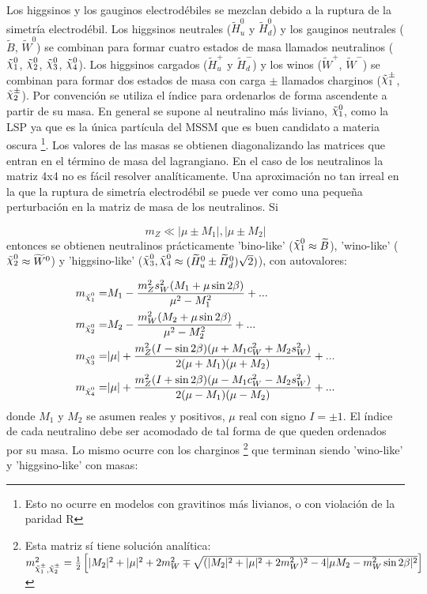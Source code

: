 Los higgsinos y los gauginos electrodébiles se mezclan debido a la ruptura de la simetría electrodébil. Los higgsinos neutrales ($\widetilde{H}_u^0$ y $\widetilde{H}_d^0$) y los gauginos neutrales ($\widetilde{B}$, $\widetilde{W}^0$) se combinan para formar cuatro estados de masa llamados neutralinos ($\ninoone$, $\ninotwo$, $\ninothree$, $\ninofour$). Los higgsinos cargados ($\widetilde{H}_u^+$ y $\widetilde{H}_d^-$) y los winos ($\widetilde{W}^+$, $\widetilde{W}^-$) se combinan para formar dos estados de masa con carga $\pm$ llamados charginos ($\chinoonepm$, $\chinotwopm$). Por convención se utiliza el índice para ordenarlos de forma ascendente a partir de su masa. En general se supone al neutralino más liviano, $\ninoone$, como la LSP ya que es la única partícula del MSSM que es buen candidato a materia oscura \footnote{Esto no ocurre en modelos con gravitinos más livianos, o con violación de la paridad R}. Los valores de las masas se obtienen diagonalizando las matrices que entran en el término de masa del lagrangiano. En el caso de los neutralinos la matriz 4x4 no es fácil resolver analíticamente. Una aproximación no tan irreal en la que la ruptura de simetría electrodébil se puede ver como una pequeña perturbación en la matriz de masa de los neutralinos. Si 

\begin{equation}
	m_Z \ll |\mu \pm M_1|, |\mu \pm M_2|
\end{equation}
%
entonces se obtienen neutralinos prácticamente 'bino-like' ($\ninoone \approx \widetilde{B}$), 'wino-like' ($\ninotwo \approx \widetilde{W}^0$) y 'higgsino-like' ($\ninothree, \ninofour \approx (\widetilde{H}_u^0 \pm \widetilde{H}_d^0)\sqrt{2})$), con autovalores:

\begin{equation}
	\begin{split}
		m_{\ninoone} = & M_1 - \frac{m_Z^2 s_W^2 (M_1 + \mu \sin{2\beta})}{\mu^2 - M_1^2} + ... \\
		m_{\ninotwo} = & M_2 - \frac{m_W^2 (M_2 + \mu \sin{2\beta})}{\mu^2 - M_2^2} + ... \\
		m_{\ninothree} = & |\mu| + \frac{m_Z^2 (I - \sin{2\beta})(\mu + M_1 c_W^2 + M_2 s_W^2)}{2 (\mu + M_1) (\mu + M_2)} + ... \\
		m_{\ninofour} = & |\mu| + \frac{m_Z^2 (I + \sin{2\beta})(\mu - M_1 c_W^2 - M_2 s_W^2)}{2 (\mu - M_1) (\mu - M_2)} + ... \\
	\end{split}
	\label{eq:nc_mass}
\end{equation}
%
donde $M_1$ y $M_2$ se asumen reales y positivos, $\mu$ real con signo $I=\pm1$. El índice de cada neutralino debe ser acomodado de tal forma de que queden ordenados por su masa. Lo mismo ocurre con los charginos \footnote{Esta matriz sí tiene solución analítica: \\ $m_{\chinoonepm, \chinotwopm}^2 = \frac{1}{2} \left[ |M_2|^2 + |\mu|^2 + 2 m_W^2 \mp \sqrt{(|M_2|^2 + |\mu|^2 + 2 m_W^2)^2 - 4 |\mu M_2 - m_W^2 \sin{2\beta}|^2} \right]$} que terminan siendo 'wino-like' y 'higgsino-like' con masas:

